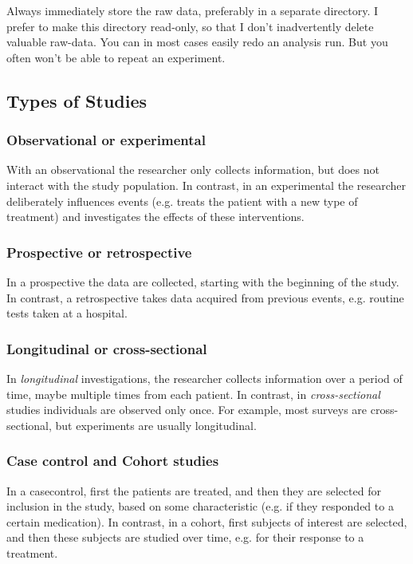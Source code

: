 Always immediately store the raw data, preferably in a separate directory. I prefer to make this directory read-only, so that I don't inadvertently delete valuable raw-data. You can in most cases easily redo an analysis run. But you often won't be able to repeat an experiment.

\subsection{Types of Studies}

\subsubsection{Observational or experimental}
With an \gls{observational} the researcher only collects information, but does not interact with the study population. In contrast, in an \gls{experimental} the researcher deliberately influences events (e.g. treats the patient with a new type of treatment) and investigates the effects of these interventions.

\subsubsection{Prospective or retrospective}
In a \gls{prospective} the data are collected, starting with the beginning of the study. In contrast, a \gls{retrospective} takes data acquired from previous events, e.g. routine tests taken at a hospital.

\subsubsection{Longitudinal or cross-sectional}
In \emph{longitudinal} investigations, the researcher collects information over a period of time, maybe multiple times from each patient. In contrast, in \emph{cross-sectional} studies individuals are observed only once. For example, most surveys are cross-sectional, but experiments are usually longitudinal.

\subsubsection{Case control and Cohort studies}
In a \gls{casecontrol}, first the patients are treated, and then they are selected for inclusion in the study, based on some characteristic (e.g. if they responded to a certain medication). In contrast, in a \gls{cohort}, first subjects of interest are selected, and then these subjects are studied over time, e.g. for their response to a treatment.

